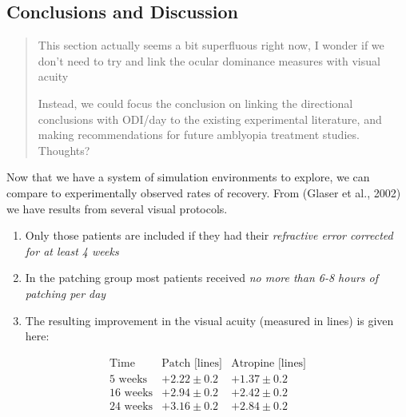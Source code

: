 \documentclass[
  onecolumn]{article}
\providecommand{\tightlist}{%
  \setlength{\itemsep}{0pt}\setlength{\parskip}{0pt}}
\begin{document}
\hypertarget{conclusions-and-discussion}{%
\subsection{Conclusions and
Discussion}\label{conclusions-and-discussion}}

\begin{quote}
This section actually seems a bit superfluous right now, I wonder if we
don't need to try and link the ocular dominance measures with visual
acuity

Instead, we could focus the conclusion on linking the directional
conclusions with ODI/day to the existing experimental literature, and
making recommendations for future amblyopia treatment studies. Thoughts?
\end{quote}

Now that we have a system of simulation environments to explore, we can
compare to experimentally observed rates of recovery. From (Glaser et
al., 2002) we have results from several visual protocols.

\begin{enumerate}
\def\labelenumi{\arabic{enumi}.}
\tightlist
\item
  Only those patients are included if they had their \emph{refractive
  error corrected for at least 4 weeks}
\item
  In the patching group most patients received \emph{no more than 6-8
  hours of patching per day}
\item
  The resulting improvement in the visual acuity (measured in lines) is
  given here:
\end{enumerate}

\[
\begin{array}{||l|c|c||}
\text{Time}& \text{Patch [lines]}& \text{Atropine [lines]}\\ 
\text{5 weeks} & +2.22\pm 0.2& +1.37\pm 0.2 \\
\text{16 weeks} & +2.94\pm 0.2& +2.42\pm 0.2 \\
\text{24 weeks} & +3.16\pm 0.2& +2.84\pm 0.2
\end{array}
\]
\end{document}

